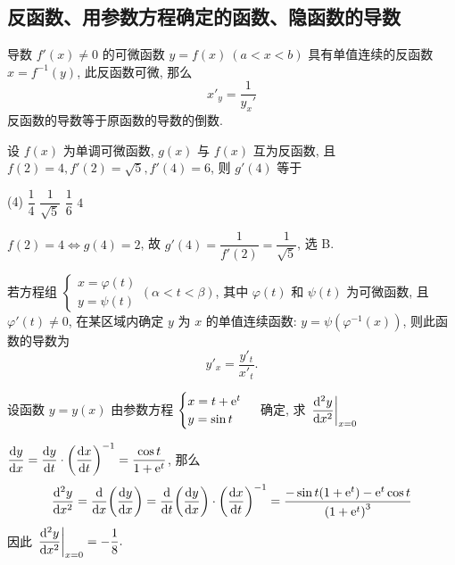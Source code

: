 \subsection{反函数、用参数方程确定的函数、隐函数的导数}

\begin{theorem}[反函数的导数]
    导数 $f'(x)\neq0$ 的可微函数 $y=f(x)~  (a<x<b)$ 具有单值连续的反函数 $x=f^{-1}(y)$, 
    此反函数可微, 那么 $$x'_y=\dfrac{1}{y_x'}$$ 反函数的导数等于原函数的导数的倒数.
\end{theorem}

\begin{example}
    设 $f(x)$ 为单调可微函数, $g(x)$ 与 $f(x)$ 互为反函数, 且 $f(2)=4,f'(2)=\sqrt{5},f'(4)=6$, 则 $g'(4)$ 等于
    \begin{tasks}(4)
        \task $\dfrac{1}{4}$
        \task $\dfrac{1}{\sqrt{5}}$
        \task $\dfrac{1}{6}$
        \task $4$
    \end{tasks}
\end{example}
\begin{solution}
    $f(2)=4\Leftrightarrow g(4)=2$, 故 $g'(4)=\dfrac{1}{f'(2)}=\dfrac{1}{\sqrt{5}}$, 选 B.
\end{solution}

\begin{theorem}[用参数方程确定的函数的导数]
    若方程组
    $\begin{cases}
            x=\varphi(t) \\
            y=\psi (t)
        \end{cases}(\alpha<t<\beta)$, 其中 $\varphi(t)$ 和 $\psi(t)$ 为可微函数, 且 $\varphi'(t)\neq0$, 
    在某区域内确定 $y$ 为 $x$ 的单值连续函数: $y=\psi\left(\varphi^{-1}(x)\right)$, 则此函数的导数为
    $$y'_x=\dfrac{y'_t}{x'_t}.$$
\end{theorem}

\begin{example}[2017 数二]
    设函数 $y=y(x)$ 由参数方程 $\begin{cases}
        x=t+\mathrm{e}^t\\y=\sin t
    \end{cases}$ 确定, 求 $\displaystyle\eval{\dv[2]{y}{x}}_{x=0}$
\end{example}
\begin{solution}
    $\displaystyle\dv{y}{x}=\dv{y}{t}\cdot\qty(\dv{x}{t})^{-1}=\dfrac{\cos t}{1+\mathrm{e}^t}$, 那么 
    $$\dv[2]{y}{x}=\dv{x}\qty(\dv{y}{x})=\dv{t}\qty(\dv{y}{x})\cdot\qty(\dv{x}{t})^{-1}=\dfrac{-\sin t\qty(1+\mathrm{e}^t)-\mathrm{e}^t\cos t}{\qty(1+\mathrm{e}^t)^3}$$
    因此 $\displaystyle\eval{\dv[2]{y}{x}}_{x=0}=-\dfrac{1}{8}.$
\end{solution}

